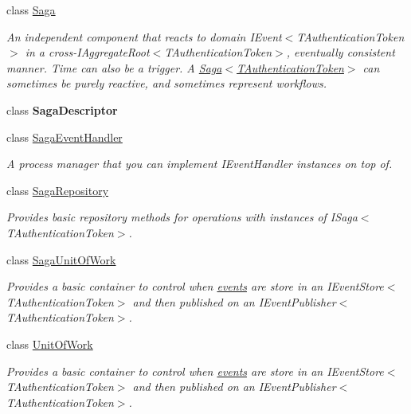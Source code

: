 \begin{DoxyCompactItemize}
class \hyperlink{classCqrs_1_1Domain_1_1Saga}{Saga}
\begin{DoxyCompactList}\small\item\em An independent component that reacts to domain I\+Event$<$\+T\+Authentication\+Token$>$ in a cross-\/I\+Aggregate\+Root$<$\+T\+Authentication\+Token$>$, eventually consistent manner. Time can also be a trigger. A \hyperlink{classCqrs_1_1Domain_1_1Saga_a1b6019cecbbf2572b64dd456cb5d91a2_a1b6019cecbbf2572b64dd456cb5d91a2}{Saga$<$\+T\+Authentication\+Token$>$} can sometimes be purely reactive, and sometimes represent workflows. \end{DoxyCompactList}\item 
class {\bfseries Saga\+Descriptor}
\item 
class \hyperlink{classCqrs_1_1Domain_1_1SagaEventHandler}{Saga\+Event\+Handler}
\begin{DoxyCompactList}\small\item\em A process manager that you can implement I\+Event\+Handler instances on top of. \end{DoxyCompactList}\item 
class \hyperlink{classCqrs_1_1Domain_1_1SagaRepository}{Saga\+Repository}
\begin{DoxyCompactList}\small\item\em Provides basic repository methods for operations with instances of I\+Saga$<$\+T\+Authentication\+Token$>$. \end{DoxyCompactList}\item 
class \hyperlink{classCqrs_1_1Domain_1_1SagaUnitOfWork}{Saga\+Unit\+Of\+Work}
\begin{DoxyCompactList}\small\item\em Provides a basic container to control when \hyperlink{}{events} are store in an I\+Event\+Store$<$\+T\+Authentication\+Token$>$ and then published on an I\+Event\+Publisher$<$\+T\+Authentication\+Token$>$. \end{DoxyCompactList}\item 
class \hyperlink{classCqrs_1_1Domain_1_1UnitOfWork}{Unit\+Of\+Work}
\begin{DoxyCompactList}\small\item\em Provides a basic container to control when \hyperlink{}{events} are store in an I\+Event\+Store$<$\+T\+Authentication\+Token$>$ and then published on an I\+Event\+Publisher$<$\+T\+Authentication\+Token$>$. \end{DoxyCompactList}\end{DoxyCompactItemize}
